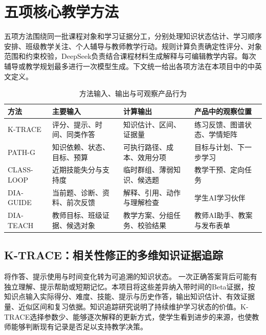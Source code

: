 \documentclass[UTF8,zihao=-4,fontset=none,a4paper]{ctexart}
\begin{document}
\section{五项核心教学方法}

五项方法围绕同一批课程对象和学习证据分工，分别处理知识状态估计、学习顺序安排、班级教学关注、个人辅导与教师教学行动。规则计算负责确定性评分、对象范围和约束校验，DeepSeek负责结合课程材料生成解释与可编辑教学内容。每次辅导或教学规划最多进行一次模型生成。下文统一给出各项方法在本项目中的中英文定义。

\begin{table}[htbp]\centering\caption{方法输入、输出与可观察产品行为}\begin{tabularx}{\linewidth}{p{2.9cm}YYY}\toprule 方法&主要输入&计算输出&产品中的观察位置\\\midrule
\mbox{K-TRACE}&评分、提示、时间、同类作答&知识估计、区间、证据量&练习反馈、图谱状态、学情矩阵\\
\mbox{PATH-G}&知识依赖、状态、目标、预算&可执行路径、成本、效用分项&目标与计划、下一步学习\\
\mbox{CLASS-LOOP}&近期技能失分与支持度&临时群组、薄弱知识、候选题&教学干预、定向任务\\
\mbox{DIA-GUIDE}&当前题、诊断、资料、前次反馈&解释、引用、动作与理解检查&学生AI学习伙伴\\
\mbox{DIA-TEACH}&教师目标、班级证据、候选对象&教学方案、分组任务、校验结果&教师AI助手、教案与发布表单\\\bottomrule\end{tabularx}\end{table}


\subsection{K-TRACE：相关性修正的多维知识证据追踪}
\methodKTrace{}将作答、提示使用与时间变化转为可追溯的知识状态。
一次正确答案背后可能有独立理解、提示帮助或短期记忆。本项目将这些差异纳入带时间的Beta证据，按知识点输入实际得分、难度、技能、提示与历史作答，输出知识估计、有效证据量、近似区间和复习依据。知识追踪研究说明了持续维护学习状态的价值\cite{corbett,piech}。K-TRACE选择参数少、能够逐次解释的更新方式，使学生看到进步的来源，也使教师能够判断现有记录是否足以支持教学决策。
\end{document}
